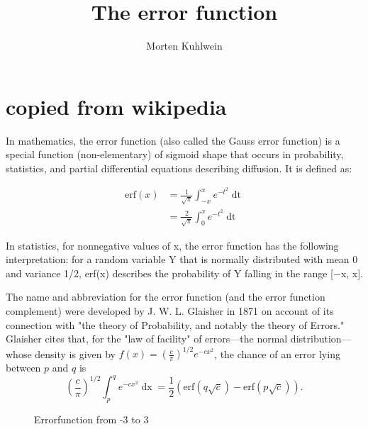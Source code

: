 \documentclass[a4paper,twocolumn]{article}
\title{The error function}
\date{}
\author{Morten Kuhlwein}
\begin{document}
	\maketitle

\section{copied from wikipedia}
	In mathematics, the error function (also called the Gauss error function) is a special function (non-elementary) of sigmoid shape that occurs in probability, statistics, and partial differential equations describing diffusion. It is defined as:

	\begin{equation}
	\begin{split}
		\mathrm{erf} (x) &= \frac{1}{\sqrt{\pi}} \int_{-x}^{x} e^{- t^{2}} \mathop{\mathrm{d} t}\\
		&= \frac{2}{\sqrt{\pi}} \int_{0}^{x} e^{- t^{2}} \mathop{\mathrm{d} t}
	\end{split}
	\end{equation}
	


In statistics, for nonnegative values of x, the error function has the following interpretation: for a random variable Y that is normally distributed with mean 0 and variance 1/2, erf(x) describes the probability of Y falling in the range [−x, x].

The name and abbreviation for the error function (and the error function complement) were developed by J. W. L. Glaisher in 1871 on account of its connection with "the theory of Probability, and notably the theory of Errors." Glaisher cites that, for the "law of facility" of errors—the normal distribution—whose density is given by $ f (x) = \left( \frac{c}{\pi} \right)^{1/2} e^{- c x^{2}} $, the chance of an error lying between $ p $ and $ q $ is
\begin{equation}
	\left( \frac{c}{\pi}\right)^{1/2} \int_{p}^{q} e^{- c x^{2}} \mathop{\mathrm{d} x} = \frac{1}{2} \left( \mathrm{erf} \left( q \sqrt{c} \right) - \mathrm{erf} \left( p \sqrt{c} \right) \right). 
\end{equation}



	\begin{figure}
		\centering
		
		\caption{Errorfunction from -3 to 3}
		\label{fig:plot}
	\end{figure}
\end{document}
